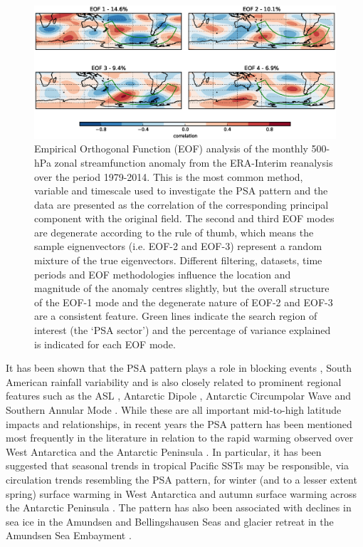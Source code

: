 \begin{figure}
\begin{center}
\includegraphics[width=1\columnwidth]{figures/psa/eof-sf_ERAInterim_500hPa_monthly_native-sh-zonal-anom.eps}
\caption{\label{fig:eof}
Empirical Orthogonal Function (EOF) analysis of the monthly 500-hPa zonal streamfunction anomaly from the ERA-Interim reanalysis over the period 1979-2014. This is the most common method, variable and timescale used to investigate the PSA pattern and the data are presented as the correlation of the corresponding principal component with the original field.  The second and third EOF modes are degenerate according to the \citet{North1982} rule of thumb, which means the sample eignenvectors (i.e. EOF-2 and EOF-3) represent a random mixture of the true eigenvectors. Different filtering, datasets, time periods and EOF methodologies influence the location and magnitude of the anomaly centres slightly, but the overall structure of the EOF-1 mode and the degenerate nature of EOF-2 and EOF-3 are a consistent feature. Green lines indicate the search region of interest (the `PSA sector') and the percentage of variance explained is indicated for each EOF mode.%
}
\end{center}
\end{figure}

It has been shown that the PSA pattern plays a role in blocking events \citep{Sinclair1997,Renwick1999}, South American rainfall variability \citep{Mo2001} and is also closely related to prominent regional features such as the ASL \citep{Turner2013}, Antarctic Dipole \citep{Yuan2001}, Antarctic Circumpolar Wave \citep{Christoph1998} and Southern Annular Mode \citep[SAM; e.g.][]{Ding2012}. While these are all important mid-to-high latitude impacts and relationships, in recent years the PSA pattern has been mentioned most frequently in the literature in relation to the rapid warming observed over West Antarctica and the Antarctic Peninsula \citep{Nicolas2014}. In particular, it has been suggested that seasonal trends in tropical Pacific SSTs may be responsible, via circulation trends resembling the PSA pattern, for winter (and to a lesser extent spring) surface warming in West Antarctica \citep{Ding2011} and autumn surface warming across the Antarctic Peninsula \citep{Ding2013}. The pattern has also been associated with declines in sea ice in the Amundsen and Bellingshausen Seas \citep{Schneider2012} and glacier retreat in the Amundsen Sea Embayment \citep{Steig2012}.

